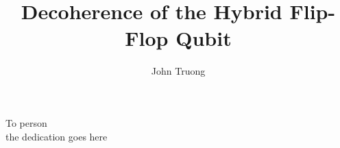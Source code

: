 \documentclass{ucbthesis}
\begin{document}

\title{Decoherence of the Hybrid Flip-Flop Qubit}
\author{John Truong}

\maketitle
\copyrightpage



\begin{frontmatter}

  \begin{dedication}
    \null\vfil
    \begin{center}
      To person\\\vspace{12pt}
      the dedication goes here
    \end{center}
    \vfil\null
  \end{dedication}

  

  \tableofcontents
  \newpage
  \listoffigures
  \newpage
  \listoftables

  

\end{frontmatter}

\pagestyle{headings}











\nocite{}


\end{document}
